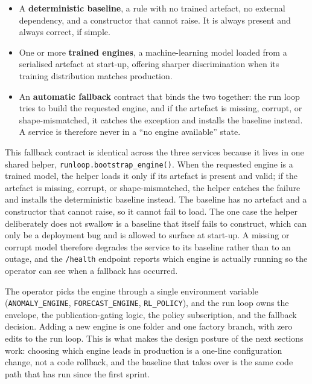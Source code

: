 \begin{itemize}
  \item A \textbf{deterministic baseline}, a rule with no trained artefact,
        no external dependency, and a constructor that cannot raise. It is
        always present and always correct, if simple.
  \item One or more \textbf{trained engines}, a machine-learning model loaded
        from a serialised artefact at start-up, offering sharper discrimination
        when its training distribution matches production.
  \item An \textbf{automatic fallback} contract that binds the two together: the
        run loop tries to build the requested engine, and if the artefact is
        missing, corrupt, or shape-mismatched, it catches the exception and
        installs the baseline instead. A service is therefore never in a
        ``no engine available'' state.
\end{itemize}

This fallback contract is identical across the three services because it lives
in one shared helper, \texttt{runloop.bootstrap\_engine()}. When the requested
engine is a trained model, the helper loads it only if its artefact is present
and valid; if the artefact is missing, corrupt, or shape-mismatched, the helper
catches the failure and installs the deterministic baseline instead. The baseline
has no artefact and a constructor that cannot raise, so it cannot fail to load.
The one case the helper deliberately does not swallow is a baseline that itself
fails to construct, which can only be a deployment bug and is allowed to surface
at start-up. A missing or corrupt model therefore degrades the service to its
baseline rather than to an outage, and the \texttt{/health} endpoint reports which
engine is actually running so the operator can see when a fallback has occurred.

The operator picks the engine through a single environment variable
(\texttt{ANOMALY\_ENGINE}, \texttt{FORECAST\_ENGINE}, \texttt{RL\_POLICY}), and
the run loop owns the envelope, the publication-gating logic, the policy
subscription, and the fallback decision. Adding a new engine is one folder and
one factory branch, with zero edits to the run loop. This is what makes the
design posture of the next sections work: choosing which engine leads in
production is a one-line configuration change, not a code rollback, and the
baseline that takes over is the same code path that has run since the first
sprint.

